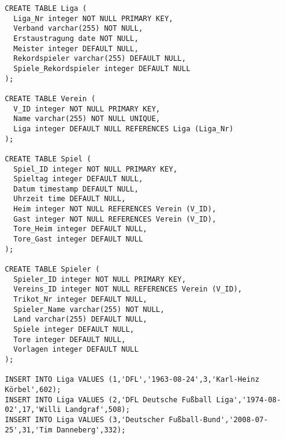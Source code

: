 \documentclass{lehramt-informatik-aufgabe}
\begin{document}
\begin{verbatim}
CREATE TABLE Liga (
  Liga_Nr integer NOT NULL PRIMARY KEY,
  Verband varchar(255) NOT NULL,
  Erstaustragung date NOT NULL,
  Meister integer DEFAULT NULL,
  Rekordspieler varchar(255) DEFAULT NULL,
  Spiele_Rekordspieler integer DEFAULT NULL
);

CREATE TABLE Verein (
  V_ID integer NOT NULL PRIMARY KEY,
  Name varchar(255) NOT NULL UNIQUE,
  Liga integer DEFAULT NULL REFERENCES Liga (Liga_Nr)
);

CREATE TABLE Spiel (
  Spiel_ID integer NOT NULL PRIMARY KEY,
  Spieltag integer DEFAULT NULL,
  Datum timestamp DEFAULT NULL,
  Uhrzeit time DEFAULT NULL,
  Heim integer NOT NULL REFERENCES Verein (V_ID),
  Gast integer NOT NULL REFERENCES Verein (V_ID),
  Tore_Heim integer DEFAULT NULL,
  Tore_Gast integer DEFAULT NULL
);

CREATE TABLE Spieler (
  Spieler_ID integer NOT NULL PRIMARY KEY,
  Vereins_ID integer NOT NULL REFERENCES Verein (V_ID),
  Trikot_Nr integer DEFAULT NULL,
  Spieler_Name varchar(255) NOT NULL,
  Land varchar(255) DEFAULT NULL,
  Spiele integer DEFAULT NULL,
  Tore integer DEFAULT NULL,
  Vorlagen integer DEFAULT NULL
);

INSERT INTO Liga VALUES (1,'DFL','1963-08-24',3,'Karl-Heinz Körbel',602);
INSERT INTO Liga VALUES (2,'DFL Deutsche Fußball Liga','1974-08-02',17,'Willi Landgraf',508);
INSERT INTO Liga VALUES (3,'Deutscher Fußball-Bund','2008-07-25',31,'Tim Danneberg',332);


\end{verbatim}
\end{document}
